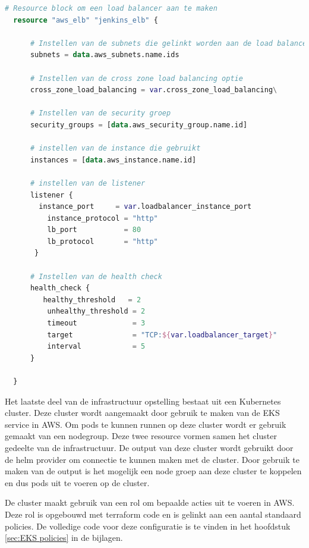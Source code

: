 \begin{lstlisting}[language=terraform]
  # Resource block om een load balancer aan te maken
  resource "aws_elb" "jenkins_elb" {
  
      # Instellen van de subnets die gelinkt worden aan de load balancer
      subnets = data.aws_subnets.name.ids
  
      # Instellen van de cross zone load balancing optie
      cross_zone_load_balancing = var.cross_zone_load_balancing\
  
      # Instellen van de security groep
      security_groups = [data.aws_security_group.name.id]
  
      # instellen van de instance die gebruikt 
      instances = [data.aws_instance.name.id]
  
      # instellen van de listener
      listener { 
        instance_port     = var.loadbalancer_instance_port 
          instance_protocol = "http" 
          lb_port           = 80 
          lb_protocol       = "http" 
       }
      
      # Instellen van de health check 
      health_check { 
         healthy_threshold   = 2 
          unhealthy_threshold = 2 
          timeout             = 3 
          target              = "TCP:${var.loadbalancer_target}"    
          interval            = 5 
      } 
      
  }
\end{lstlisting}

\vspace{0.5cm}
Het laatste deel van de infrastructuur opstelling bestaat uit een Kubernetes cluster. Deze cluster wordt aangemaakt door gebruik te maken van de EKS service in AWS. Om pods te kunnen runnen op deze cluster wordt er gebruik gemaakt van een nodegroup. Deze twee resource vormen samen het cluster gedeelte van de infrastructuur. De output van deze cluster wordt gebruikt door de helm provider om connectie te kunnen maken met de cluster. Door gebruik te maken van de output is het mogelijk een node groep aan deze cluster te koppelen en dus pods uit te voeren op de cluster.
\newline

De cluster maakt gebruik van een rol om bepaalde acties uit te voeren in AWS. Deze rol is opgebouwd met terraform code en is gelinkt aan een aantal standaard policies. De volledige code voor deze configuratie is te vinden in het hoofdstuk \ref{sec:EKS policies} in de bijlagen. 
\newline

